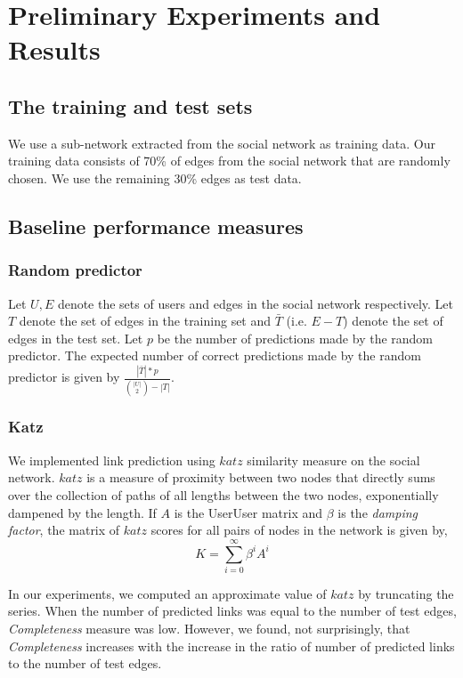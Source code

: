 \documentclass{report}
\begin{document}
\chapter{Preliminary Experiments and Results}
\section{The training and test sets}
We use a sub-network extracted from the social network as training data. Our training data consists of 70\% of edges from the social network that are randomly chosen. We use the remaining 30\% edges as test data.

\section{Baseline performance measures}
\subsection{Random predictor}
Let $U, E$ denote the sets of users and edges in the social network respectively. Let $T$ denote the set of edges in the training set and $\bar{T}$ (i.e. $E - T$) denote the set of edges in the test set. Let $p$ be the number of predictions made by the random predictor. The expected number of correct predictions made by the random predictor is given by $\frac{|\bar{T}|*p}{\binom{|U|}{2}-|T|}$.

\subsection{Katz}
We implemented link prediction using $katz$ similarity measure on the social network. $katz$ is a measure of proximity between two nodes that directly sums over the collection of paths of all lengths between the two nodes, exponentially dampened by the length. If $A$ is the UserUser matrix and $\beta$ is the \textit{damping factor}, the matrix of $katz$ scores for all pairs of nodes in the network is given by,
\begin{equation*}
K = \sum_{i=0}^{\infty}\beta^iA^i 
\end{equation*}

In our experiments, we computed an approximate value of $katz$ by truncating the series. When the number of predicted links was equal to the number of test edges, \textit{Completeness} measure was low. However, we found, not surprisingly, that \textit{Completeness} increases with the increase in the ratio of number of predicted links to the number of test edges.
\end{document}
